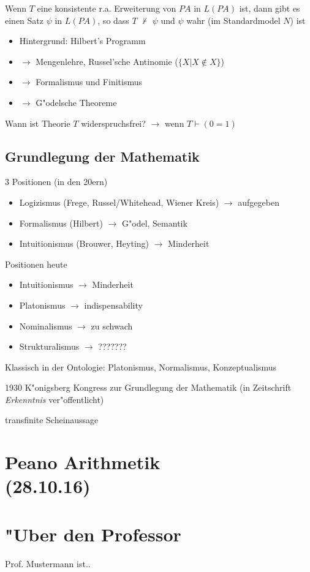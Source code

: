 \documentclass[]{scrartcl}
\begin{document}
Wenn $T$ eine konsistente r.a. Erweiterung von $PA$ in $L(PA)$ ist, dann gibt es einen Satz $\psi$ in $L(PA)$, so dass $T$ $\not \vdash$ $\psi$ und $\psi$ wahr (im Standardmodel $N$) ist

\begin{itemize}
  \item Hintergrund: Hilbert's Programm
  \item $\rightarrow$ Mengenlehre, Russel'sche Antinomie ($\{ X | X \notin X \}$)
  \item $\rightarrow$ Formalismus und Finitismus
  \item $\rightarrow$ G"odelsche Theoreme
\end{itemize}

Wann ist Theorie $T$ widerspruchsfrei? $\rightarrow$ wenn $T \vdash (0 = 1)$


\subsection{Grundlegung der Mathematik}

3 Positionen (in den 20ern)

\begin{itemize}
  \item Logizismus (Frege, Russel/Whitehead, Wiener Kreis) $\rightarrow$ aufgegeben
  \item Formalismus (Hilbert) $\rightarrow$ G"odel, Semantik
  \item Intuitionismus (Brouwer, Heyting) $\rightarrow$ Minderheit
\end{itemize}

Positionen heute

\begin{itemize}
  \item Intuitionismus $\rightarrow$ Minderheit
  \item Platonismus  $\rightarrow$ indispensability
  \item Nominalismus $\rightarrow$ zu schwach
  \item Strukturalismus $\rightarrow$ ???????
  
\end{itemize}

Klassisch in der Ontologie: Platonismus, Normalismus, Konzeptualismus
\newline

1930 K"onigsberg Kongress zur Grundlegung der Mathematik (in Zeitschrift \emph{Erkenntnis} ver"offentlicht)

transfinite Scheinaussage


\section{Peano Arithmetik\\(28.10.16)}





\newpage
\section{"Uber den Professor}
Prof. Mustermann ist..
\end{document}

